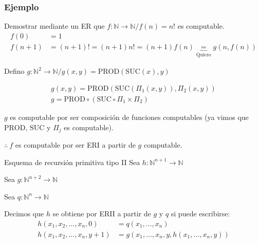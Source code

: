 \subsubsection{Ejemplo}
Demostrar mediante un ER que $f: \mathbb{N} \to \mathbb{N}/f(n) = n!$ es
computable.
%
\begin{align*}
    f(0) &= 1 \\
    f(n+1) &= (n+1)! = (n+1) n! = (n+1) f(n) \underbrace{=}_{\text{Quiero}} 
    g(n, f(n))
\end{align*}

Defino $g: \mathbb{N}^2 \to \mathbb{N} / g(x,y) = 
\mathrm{PROD}(\mathrm{SUC}(x),y)$

\begin{align*}
    g(x,y) = \mathrm{PROD}(\mathrm{SUC}(\Pi_1 (x,y)), \Pi_2 (x,y)) \\
    g = \mathrm{PROD} \circ (\mathrm{SUC} \circ \Pi_1 \times \Pi_2)
\end{align*}

\smallskip

$g$ es computable por ser composición de funciones computables 
%
(ya vimos que $\mathrm{PROD}$, $\mathrm{SUC}$ y $\Pi_j$ es computable).

\begin{center}
    $\therefore ~ f$ es computable por ser ERI a partir de $g$ computable.
\end{center} 

\bigskip

%
\begin{definicion}{Esquema de recursión primitiva tipo II}{}
    Sea $h: \mathbb{N}^{n+1} \to \mathbb{N}$
    
    Sea $g: \mathbb{N}^{n+2} \to \mathbb{N}$

    Sea $q: \mathbb{N}^{n} \to \mathbb{N}$

    \medskip

    Decimos que $h$ se obtiene por ERII a partir de $g$ y $q$ si puede 
    escribirse:
    \begin{align*}
        h(x_1, x_2, \dotsc, x_n, 0) &= q(x_1, \dotsc, x_n) \\
        h(x_1, x_2, \dotsc, x_n, y+1) &= g(x_1, \dotsc, x_n, y, 
        h(x_1,\dotsc, x_n, y))
    \end{align*}
\end{definicion}


